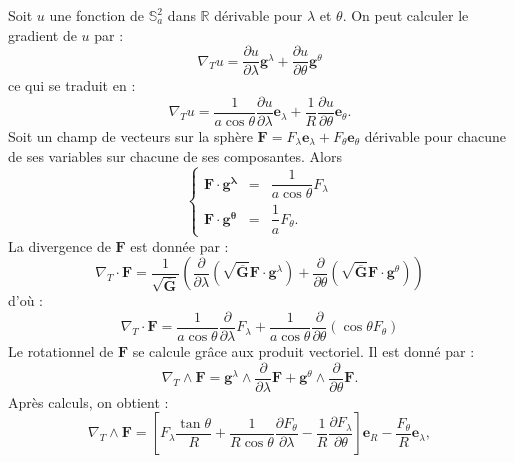 Soit $u$ une fonction de $\mathbb{S}_a^2$ dans $\mathbb{R}$ dérivable pour $\lambda$ et $\theta$. On peut calculer le gradient de $u$ par :
\begin{equation}
\nabla_T u = \dfrac{\partial u}{\partial \lambda} \mathbf{g}^{\lambda} + \dfrac{\partial u}{\partial \theta} \mathbf{g}^{\theta}
\end{equation}
ce qui se traduit en :
\begin{equation}\label{gradient_lonlat}
\nabla_T u = \dfrac{1}{a \cos \theta}\dfrac{\partial u}{\partial \lambda} \mathbf{e}_{\lambda} + \dfrac{1}{R} \dfrac{\partial u}{\partial \theta} \mathbf{e}_{\theta}.
\end{equation}
Soit un champ de vecteurs sur la sphère $\mathbf{F} = F_{\lambda} \mathbf{e}_{\lambda} + F_{\theta} \mathbf{e}_{\theta}$ dérivable pour chacune de ses variables sur chacune de ses composantes. Alors 
\begin{equation}
\left\lbrace 
\begin{array}{rcl}
\mathbf{F} \cdot \mathbf{g^{\lambda}} & = & \dfrac{1}{a \cos \theta} F_{\lambda} \\
\mathbf{F} \cdot \mathbf{g^{\theta}} & = & \dfrac{1}{a} F_{\theta}.
\end{array}
\right.
\end{equation}
La divergence de $\mathbf{F}$ est donnée par :
\begin{equation}
\nabla_T \cdot \mathbf{F} = \dfrac{1}{\sqrt{\overline{\mathbf{G}}}} \left( \dfrac{\partial}{\partial \lambda} \left( \sqrt{\overline{\mathbf{G}}} \mathbf{F} \cdot \mathbf{g}^{\lambda}  \right) +  \dfrac{\partial}{\partial \theta} \left( \sqrt{\overline{\mathbf{G}}} \mathbf{F} \cdot \mathbf{g}^{\theta}  \right)  \right)
\end{equation}
d'où :
\begin{equation}\label{divergence_lonlat}
\nabla_T \cdot \mathbf{F} = \dfrac{1}{a \cos \theta} \dfrac{\partial}{\partial \lambda}  F_{\lambda} + \dfrac{1}{a \cos \theta} \dfrac{\partial}{\partial \theta} \left( \cos \theta F_{\theta} \right)
\end{equation}
Le rotationnel de $\mathbf{F}$ se calcule grâce aux produit vectoriel. Il est donné par :
\begin{equation}
\nabla_T \wedge \mathbf{F} = \mathbf{g}^{\lambda} \wedge \dfrac{\partial}{\partial \lambda}\mathbf{F} + \mathbf{g}^{\theta} \wedge \dfrac{\partial}{\partial \theta}\mathbf{F}.
\end{equation}
Après calculs, on obtient :
\begin{equation}\label{rotationnel_lonlat}
\nabla_T \wedge \mathbf{F} = \left[ F_{\lambda} \dfrac{\tan \theta}{R} + \dfrac{1}{R \cos \theta} \dfrac{\partial F_{\theta}}{\partial \lambda} - \dfrac{1}{R} \dfrac{\partial F_{\lambda}}{\partial \theta} \right] \mathbf{e}_R - \dfrac{F_{\theta}}{R} \mathbf{e}_{\lambda},
\end{equation}
